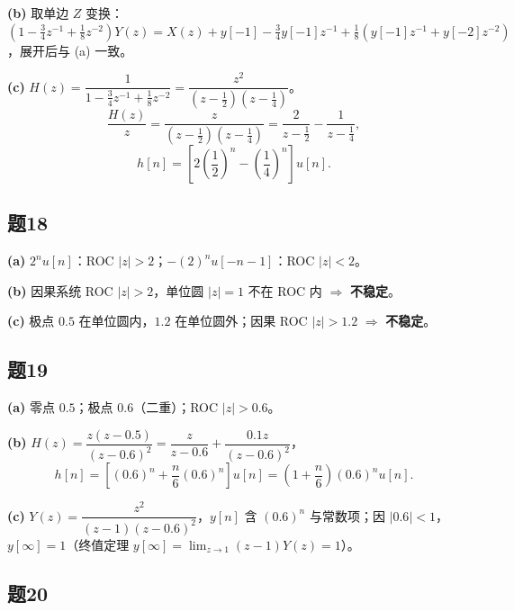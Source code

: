 \documentclass[11pt,a4paper]{ctexart}
\begin{document}
\textbf{(b)} 取单边 $Z$ 变换：$(1-\frac{3}{4}z^{-1}+\frac{1}{8}z^{-2})Y(z)=X(z)+y[-1]-\frac{3}{4}y[-1]z^{-1}+\frac{1}{8}(y[-1]z^{-1}+y[-2]z^{-2})$，展开后与 (a) 一致。

\textbf{(c)} $H(z)=\dfrac{1}{1-\frac{3}{4}z^{-1}+\frac{1}{8}z^{-2}}=\dfrac{z^2}{(z-\frac{1}{2})(z-\frac{1}{4})}$。
\[
\frac{H(z)}{z}=\frac{z}{(z-\frac{1}{2})(z-\frac{1}{4})}=\frac{2}{z-\frac{1}{2}}-\frac{1}{z-\frac{1}{4}},
\]
\[
h[n]=\left[2\left(\frac{1}{2}\right)^n-\left(\frac{1}{4}\right)^n\right]u[n].
\]

\subsection*{题18}

\textbf{(a)} $2^n u[n]$：ROC $|z|>2$；$-(2)^n u[-n-1]$：ROC $|z|<2$。

\textbf{(b)} 因果系统 ROC $|z|>2$，单位圆 $|z|=1$ 不在 ROC 内 $\Rightarrow$ \textbf{不稳定}。

\textbf{(c)} 极点 $0.5$ 在单位圆内，$1.2$ 在单位圆外；因果 ROC $|z|>1.2$ $\Rightarrow$ \textbf{不稳定}。

\begin{figure}[htbp]
\centering
{}
\end{figure}

\subsection*{题19}

\textbf{(a)} 零点 $0.5$；极点 $0.6$（二重）；ROC $|z|>0.6$。

\textbf{(b)} $H(z)=\dfrac{z(z-0.5)}{(z-0.6)^2}=\dfrac{z}{z-0.6}+\dfrac{0.1z}{(z-0.6)^2}$，
\[
h[n]=\left[(0.6)^n+\frac{n}{6}(0.6)^n\right]u[n]=\left(1+\frac{n}{6}\right)(0.6)^n u[n].
\]

\textbf{(c)} $Y(z)=\dfrac{z^2}{(z-1)(z-0.6)^2}$，$y[n]$ 含 $(0.6)^n$ 与常数项；因 $|0.6|<1$，$y[\infty]=1$（终值定理 $y[\infty]=\lim_{z\to1}(z-1)Y(z)=1$）。

\subsection*{题20}
\end{document}

